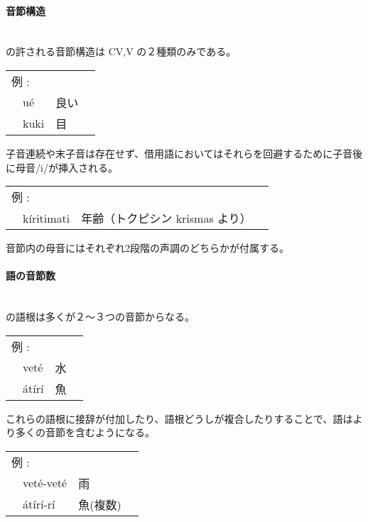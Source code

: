 \paragraph{音節構造}\quad\\
\langname の許される音節構造は CV,V の２種類のみである。

\begin{tabular}{llll}
    \multicolumn{2}{l}{例 : } \\ 
    & u\'e & 良い \\
    & kuki & 目 \\
\end{tabular}

子音連続や末子音は存在せず、借用語においてはそれらを回避するために子音後に母音/i/が挿入される。

\begin{tabular}{llll}
    \multicolumn{2}{l}{例 : } \\ 
    & k\'iritimati & 年齢（トクピシン krismas より） \\
\end{tabular}

音節内の母音にはそれぞれ2段階の声調のどちらかが付属する。

\paragraph{語の音節数}\quad\\
\langname の語根は多くが２～３つの音節からなる。

\begin{tabular}{llll}
    \multicolumn{2}{l}{例 : } \\ 
    & vet\'e & 水 \\
    & \'at\'ir\'i & 魚 \\
\end{tabular}

これらの語根に接辞が付加したり、語根どうしが複合したりすることで、語はより多くの音節を含むようになる。

\begin{tabular}{llll}
    \multicolumn{2}{l}{例 : } \\ 
    & vet\'e-vet\'e & 雨 \\
    & \'at\'ir\'i-r\'i & 魚(複数) \\
\end{tabular}